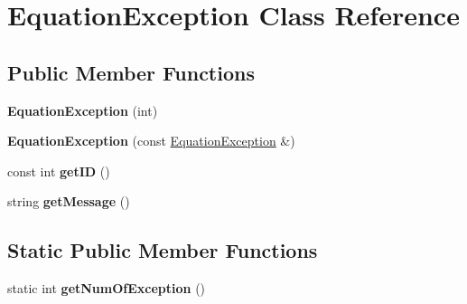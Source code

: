 \hypertarget{class_equation_exception}{}\section{Equation\+Exception Class Reference}
\label{class_equation_exception}
\subsection*{Public Member Functions}
\begin{DoxyCompactItemize}
\item 
\hypertarget{class_equation_exception_a6e4d39e1106b74b1fe9bd3ff1db65572}{}{\bfseries Equation\+Exception} (int)\label{class_equation_exception_a6e4d39e1106b74b1fe9bd3ff1db65572}

\item 
\hypertarget{class_equation_exception_a5d422611e1fdc10ffae5b35fdd6b8a94}{}{\bfseries Equation\+Exception} (const \hyperlink{class_equation_exception}{Equation\+Exception} \&)\label{class_equation_exception_a5d422611e1fdc10ffae5b35fdd6b8a94}

\item 
\hypertarget{class_equation_exception_a7136df9925f88b6c0e85ba9363f632eb}{}const int {\bfseries get\+I\+D} ()\label{class_equation_exception_a7136df9925f88b6c0e85ba9363f632eb}

\item 
\hypertarget{class_equation_exception_ab26d2fcc03011ba4063ee7d24b8ba5bd}{}string {\bfseries get\+Message} ()\label{class_equation_exception_ab26d2fcc03011ba4063ee7d24b8ba5bd}

\end{DoxyCompactItemize}
\subsection*{Static Public Member Functions}
\begin{DoxyCompactItemize}
\item 
\hypertarget{class_equation_exception_ad7639fb8008ee527423d885a78328157}{}static int {\bfseries get\+Num\+Of\+Exception} ()\label{class_equation_exception_ad7639fb8008ee527423d885a78328157}

\end{DoxyCompactItemize}
